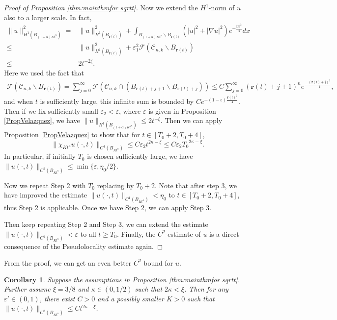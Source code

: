 \documentclass[11pt]{amsart}
\numberwithin{equation}{section}
\newtheorem{corollary}[theorem]{Corollary}
\numberwithin{equation}{section}
\newcommand{\eps}{\varepsilon}
\newcommand{\br}{\mathbf{r}}
\newcommand{\cC}{\mathcal{C}}
\newcommand{\cF}{\mathcal{F}}
\begin{document}
\begin{proof}[Proof of Proposition \ref{thm:mainthmfor sqrtt}]
		
		 Now we extend the $H^1$-norm of $u$ also to a larger scale. In fact,
		\begin{align*}
			\|u\|_{H^1(B_{(1+\alpha)Kt^{\kappa}})}^2
			=&
			\|u\|_{H^1(B_{\br(t)})}^2
			+
			\int_{B_{(1+\alpha)Kt^{\kappa}}\backslash B_{\br(t)}}
			(|u|^2+|\nabla u|^2) e^{-\frac{|x|^2}{4}}dx
			\\
			\leq &
			\|u\|_{H^1(B_{\br(t)})}^2
			+
			\eps_1^2 \cF(\cC_{n,k}\backslash B_{\br(t)})
			\\
			\leq &2t^{-2\xi}.
		\end{align*}
		Here we used the fact that 
		\begin{align*}
			\cF(\cC_{n,k}\backslash B_{\br(t)})
			= \sum_{j=0}^\infty \cF(\cC_{n,k}\cap(B_{\br(t)+j+1}\backslash B_{\br(t)+j}))
			\leq 
			C\sum_{j=0}^\infty (\br(t)+j+1)^n e^{-\frac{(\br(t)+j)^2}{4}},
		\end{align*}
		and when $t$ is sufficiently large, this infinite sum is bounded by $Ce^{-(1-\epsilon)\frac{\br(t)^{2}}{4}}$. Then if we fix sufficiently small $\eps_2<\bar\eps$, where $\bar\eps$ is given in Proposition \ref{PropVelazquez}, we have $\|u\|_{H^1(B_{(1+\alpha)Kt^{\kappa}})}\leq 2t^{-\xi}$. Then we can apply Proposition \ref{PropVelazquez} to show that for $t\in[T_0+2, T_0+4]$,
		\begin{equation}
			\|\chi_{Kt^\kappa} u(\cdot,t)\|_{C^1(B_{K t^{\kappa}})}\leq C\eps_2 t^{2\kappa-\xi}\leq C\eps_2 {T_0}^{2\kappa-\xi}.
		\end{equation}
		In particular, if initially $T_0$ is chosen sufficiently large, we have $\|u(\cdot,t)\|_{C^1(B_{K t^{\kappa}})}\leq \min\{\eps,\eta_0/2\}.$
		
		 Now we repeat Step 2 with $T_0$ replacing by $T_0+2$. Note that after step 3, we have improved the estimate $\|u(\cdot,t)\|_{C^1(B_{Kt^\kappa})}<\eta_0$ to $t\in[T_0+2,T_0+4]$, thus Step 2 is applicable. Once we have Step 2, we can apply Step 3.
		
		Then keep repeating Step 2 and Step 3, we can extend the estimate $\|u(\cdot,t)\|_{C^1(B_{K t^{\kappa}})}< \eps$ to all $t\geq T_0$. Finally, the $C^2$-estimate of $u$ is a direct consequence of the Pseudolocality estimate again.
	\end{proof}
	
	From the proof, we can get an even better $C^2$ bound for $u$.
	
	\begin{corollary}\label{cor_C2_bound_for_kappa<1/2}
		Suppose the assumptions in Proposition \ref{thm:mainthmfor sqrtt}. Further assume $\xi=3/8$ and $\kappa\in(0,1/2)$ such that $2\kappa<\xi$. Then for any $\eps'\in(0,1)$, there exist $C>0$ and a possibly smaller $K>0$ such that $\|u(\cdot,t)\|_{C^2(B_{ K t^\kappa})}\leq Ct^{2\kappa-\xi}$.
	\end{corollary}
	
\end{document}
